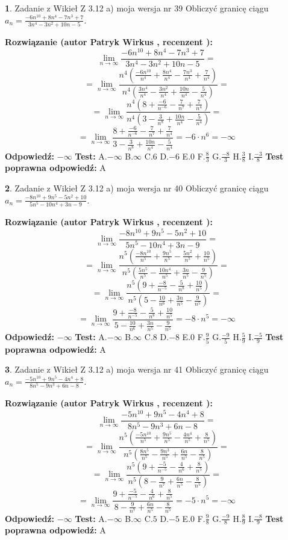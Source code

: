\documentclass[12pt, a4paper]{article}
\theoremstyle{definition} %
\newtheorem{zad}{}
\newcommand{\zadStart}[1]{\begin{zad}#1\newline}
\newcommand{\zadStop}{\end{zad}}
\newcommand{\rozwStart}[2]{\noindent \textbf{Rozwiązanie (autor #1 , recenzent #2): }\newline}
\newcommand{\rozwStop}{\newline}
\newcommand{\odpStart}{\noindent \textbf{Odpowiedź:}\newline}
\newcommand{\odpStop}{\newline}
\newcommand{\testStart}{\noindent \textbf{Test:}\newline}
\newcommand{\testStop}{\newline}
\newcommand{\kluczStart}{\noindent \textbf{Test poprawna odpowiedź:}\newline}
\newcommand{\kluczStop}{\newline}
\begin{document}
\zadStart{Zadanie z Wikieł Z 3.12 a) moja wersja nr 39}
Obliczyć granicę ciągu $a_{n}=\frac{-6n^{10}+8n^{4}-7n^{3}+7}{3n^{4}-3n^{2}+10n-5}$.
\zadStop
\rozwStart{Patryk Wirkus}{}
$$\lim\limits_{n\to\infty}\frac{-6n^{10}+8n^{4}-7n^{3}+7}{3n^{4}-3n^{2}+10n-5}=$$
$$=\lim\limits_{n\to\infty}\frac{n^{4}\left(\frac{-6n^{10}}{n^{4}}+\frac{8n^{4}}{n^{4}}-\frac{7n^{3}}{n^{4}}+\frac{7}{n^{4}}\right)}{n^{4}\left(\frac{3n^{4}}{n^{4}}-\frac{3n^{2}}{n^{4}}+\frac{10n}{n^{4}}-\frac{5}{n^{4}}\right)}=$$
$$=\lim\limits_{n\to\infty}\frac{n^{4}\left(8+\frac{-6}{n^{-6}}-\frac{7}{n^{7}}+\frac{7}{n^{4}}\right)}
{n^{4}\left(3-\frac{3}{n^{8}}+\frac{10n}{n^{4}}-\frac{5}{n^{4}}\right)}=$$
$$=\lim\limits_{n\to\infty}\frac{8+\frac{-6}{n^{-6}}-\frac{7}{n^{7}}+\frac{7}{n^{4}}}{3-\frac{3}{n^{8}}+\frac{10n}{n^{4}}-\frac{5}{n^{4}}}=-6\cdot n^{6} = -\infty$$
\rozwStop
\odpStart
$-\infty$
\odpStop
\testStart
A.$-\infty$
B.$\infty$
C.$6$
D.$-6$
E.$0$
F.$\frac{8}{3}$
G.$\frac{-8}{3}$
H.$\frac{3}{8}$
I.$\frac{-3}{8}$
\testStop
\kluczStart
A
\kluczStop



\zadStart{Zadanie z Wikieł Z 3.12 a) moja wersja nr 40}
Obliczyć granicę ciągu $a_{n}=\frac{-8n^{10}+9n^{5}-5n^{2}+10}{5n^{5}-10n^{4}+3n-9}$.
\zadStop
\rozwStart{Patryk Wirkus}{}
$$\lim\limits_{n\to\infty}\frac{-8n^{10}+9n^{5}-5n^{2}+10}{5n^{5}-10n^{4}+3n-9}=$$
$$=\lim\limits_{n\to\infty}\frac{n^{5}\left(\frac{-8n^{10}}{n^{5}}+\frac{9n^{5}}{n^{5}}-\frac{5n^{2}}{n^{5}}+\frac{10}{n^{5}}\right)}{n^{5}\left(\frac{5n^{5}}{n^{5}}-\frac{10n^{4}}{n^{5}}+\frac{3n}{n^{5}}-\frac{9}{n^{5}}\right)}=$$
$$=\lim\limits_{n\to\infty}\frac{n^{5}\left(9+\frac{-8}{n^{-5}}-\frac{5}{n^{8}}+\frac{10}{n^{5}}\right)}
{n^{5}\left(5-\frac{10}{n^{6}}+\frac{3n}{n^{5}}-\frac{9}{n^{5}}\right)}=$$
$$=\lim\limits_{n\to\infty}\frac{9+\frac{-8}{n^{-5}}-\frac{5}{n^{8}}+\frac{10}{n^{5}}}{5-\frac{10}{n^{6}}+\frac{3n}{n^{5}}-\frac{9}{n^{5}}}=-8\cdot n^{5} = -\infty$$
\rozwStop
\odpStart
$-\infty$
\odpStop
\testStart
A.$-\infty$
B.$\infty$
C.$8$
D.$-8$
E.$0$
F.$\frac{9}{5}$
G.$\frac{-9}{5}$
H.$\frac{5}{9}$
I.$\frac{-5}{9}$
\testStop
\kluczStart
A
\kluczStop



\zadStart{Zadanie z Wikieł Z 3.12 a) moja wersja nr 41}
Obliczyć granicę ciągu $a_{n}=\frac{-5n^{10}+9n^{5}-4n^{4}+8}{8n^{5}-9n^{3}+6n-8}$.
\zadStop
\rozwStart{Patryk Wirkus}{}
$$\lim\limits_{n\to\infty}\frac{-5n^{10}+9n^{5}-4n^{4}+8}{8n^{5}-9n^{3}+6n-8}=$$
$$=\lim\limits_{n\to\infty}\frac{n^{5}\left(\frac{-5n^{10}}{n^{5}}+\frac{9n^{5}}{n^{5}}-\frac{4n^{4}}{n^{5}}+\frac{8}{n^{5}}\right)}{n^{5}\left(\frac{8n^{5}}{n^{5}}-\frac{9n^{3}}{n^{5}}+\frac{6n}{n^{5}}-\frac{8}{n^{5}}\right)}=$$
$$=\lim\limits_{n\to\infty}\frac{n^{5}\left(9+\frac{-5}{n^{-5}}-\frac{4}{n^{6}}+\frac{8}{n^{5}}\right)}
{n^{5}\left(8-\frac{9}{n^{7}}+\frac{6n}{n^{5}}-\frac{8}{n^{5}}\right)}=$$
$$=\lim\limits_{n\to\infty}\frac{9+\frac{-5}{n^{-5}}-\frac{4}{n^{6}}+\frac{8}{n^{5}}}{8-\frac{9}{n^{7}}+\frac{6n}{n^{5}}-\frac{8}{n^{5}}}=-5\cdot n^{5} = -\infty$$
\rozwStop
\odpStart
$-\infty$
\odpStop
\testStart
A.$-\infty$
B.$\infty$
C.$5$
D.$-5$
E.$0$
F.$\frac{9}{8}$
G.$\frac{-9}{8}$
H.$\frac{8}{9}$
I.$\frac{-8}{9}$
\testStop
\kluczStart
A
\kluczStop
\end{document}
